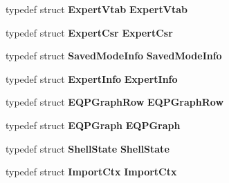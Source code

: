 \begin{DoxyCompactItemize}
\item 
typedef struct \textbf{ Expert\+Vtab} \textbf{ Expert\+Vtab}
\item 
typedef struct \textbf{ Expert\+Csr} \textbf{ Expert\+Csr}
\item 
typedef struct \textbf{ Saved\+Mode\+Info} \textbf{ Saved\+Mode\+Info}
\item 
typedef struct \textbf{ Expert\+Info} \textbf{ Expert\+Info}
\item 
typedef struct \textbf{ E\+Q\+P\+Graph\+Row} \textbf{ E\+Q\+P\+Graph\+Row}
\item 
typedef struct \textbf{ E\+Q\+P\+Graph} \textbf{ E\+Q\+P\+Graph}
\item 
typedef struct \textbf{ Shell\+State} \textbf{ Shell\+State}
\item 
typedef struct \textbf{ Import\+Ctx} \textbf{ Import\+Ctx}
\end{DoxyCompactItemize}
